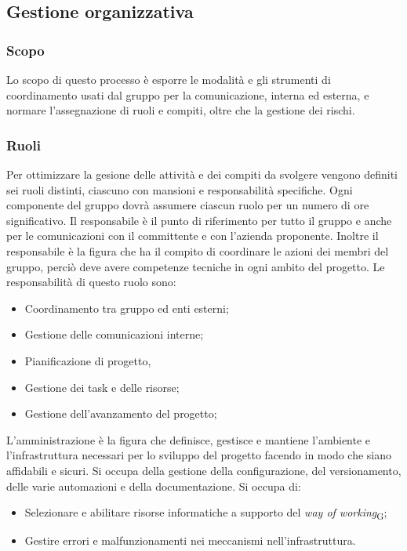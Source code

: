 \subsection{Gestione organizzativa}
\subsubsection{Scopo}
Lo scopo di questo processo è esporre le modalità e gli strumenti di coordinamento usati dal gruppo per la comunicazione, interna ed esterna, e normare l'assegnazione di ruoli e compiti, oltre che la gestione dei rischi.

\subsubsection{Ruoli}
Per ottimizzare la gesione delle attività e dei compiti da svolgere vengono definiti sei ruoli distinti, ciascuno con mansioni e responsabilità specifiche. Ogni componente del gruppo dovrà assumere ciascun ruolo per un numero di ore significativo.
Il responsabile è il punto di riferimento per tutto il gruppo e anche per le comunicazioni con il committente e con l'azienda proponente.
Inoltre il responsabile è la figura che ha il compito di coordinare le azioni dei membri del gruppo, perciò deve avere competenze tecniche in ogni ambito del progetto. Le responsabilità di questo ruolo sono:
\begin{itemize}
    \item Coordinamento tra gruppo ed enti esterni;
    \item Gestione delle comunicazioni interne;
    \item Pianificazione di progetto,
    \item Gestione dei task e delle risorse;
    \item Gestione dell'avanzamento del progetto;
\end{itemize}
L'amministrazione è la figura che definisce, gestisce e mantiene l’ambiente e l’infrastruttura necessari per lo
sviluppo del progetto facendo in modo che siano affidabili e sicuri. Si occupa della gestione della configurazione, del versionamento, delle varie automazioni e della documentazione. Si occupa di:
\begin{itemize}
    \item Selezionare e abilitare risorse informatiche a supporto del \textit{way of working}\textsubscript{G};
    \item Gestire errori e malfunzionamenti nei meccanismi nell’infrastruttura.
\end{itemize}

